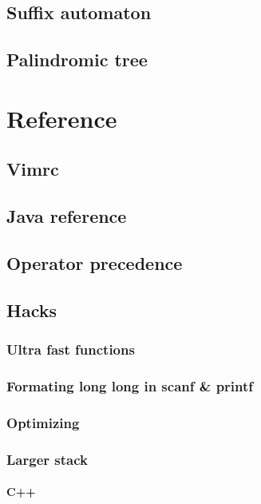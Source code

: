 \documentclass[UTF8,a4paper]{report}
\begin{document}
		\section{Suffix automaton}
			
		\section{Palindromic tree}
			
	\chapter{Reference}
		\section{Vimrc}
			
		\section{Java reference}
			
		\section{Operator precedence}
			
		\section{Hacks}
			\subsection{Ultra fast functions}
				
			\subsection{Formating long long in scanf \& printf}
				
			\subsection{Optimizing}
				
			\subsection{Larger stack}
				\subsubsection{C++}
					
\end{document}
